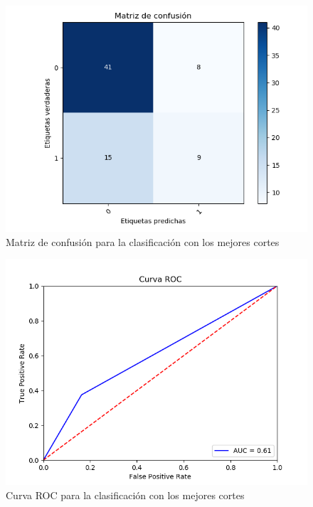 \begin{figure}[H] %
	\centering
	\includegraphics[scale=0.65]{conf2.png}  %
	\caption{Matriz de confusión para la clasificación con los mejores cortes} 
	\label{fig:conf-mat-exp3}
\end{figure}

\begin{figure}[H] %
	\centering
	\includegraphics[scale=0.6]{roc2.png}  %
	\caption{Curva ROC para la clasificación con los mejores cortes} 
	\label{fig:roc-exp3}
\end{figure}

